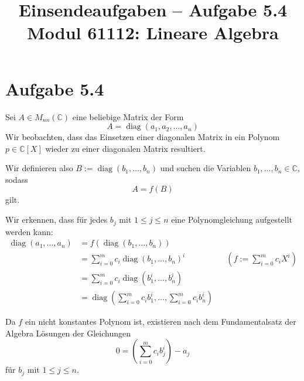 \documentclass[a4paper,12pt]{article}
\title{Einsendeaufgaben -- Aufgabe 5.4\\[0.5em]
\large Modul 61112: Lineare Algebra}
\author{}
\date{}
\DeclareMathOperator{\diag}{diag}
\begin{document}
\maketitle

\section*{Aufgabe 5.4}

Sei $A \in M_{nn}(\mathbb{C})$ eine beliebige Matrix der Form
\[
  A = \diag(a_1, a_2, \ldots, a_n)
\]
Wir beobachten, dass das Einsetzen einer diagonalen Matrix in ein Polynom
$p \in \mathbb{C}[X]$ wieder zu einer diagonalen Matrix resultiert.

Wir definieren also $B := \diag(b_1, \ldots, b_n)$ und suchen die Variablen
$b_1, \ldots, b_n \in \mathbb{C}$, sodass
\[
  A = f(B)
\]
gilt.

Wir erkennen, dass für jedes $b_j$ mit $1 \leq j \leq n$ eine Polynomgleichung
aufgestellt werden kann:
\begin{align*}
  \diag(a_1, \ldots, a_n)
    &= f(\diag(b_1, \ldots, b_n)) \\
    &= \sum_{i=0}^{m} c_i \diag(b_1, \ldots, b_n)^i
       && \left( f := \sum_{i=0}^{m} c_i X^i \right) \\
    &= \sum_{i=0}^{m} c_i \diag(b_1^i, \ldots, b_n^i) \\
    &= \diag\left( \sum_{i=0}^{m} c_i b_1^i, \ldots, \sum_{i=0}^{m} c_i b_n^i \right)
\end{align*}

Da $f$ ein nicht konstantes Polynom ist, existieren nach dem Fundamentalsatz der
Algebra Lösungen der Gleichungen
\[
  0 = \left( \sum_{i=0}^{m} c_i b_j^i \right) - a_j
\]
für $b_j$ mit $1 \leq j \leq n$.
\end{document}
